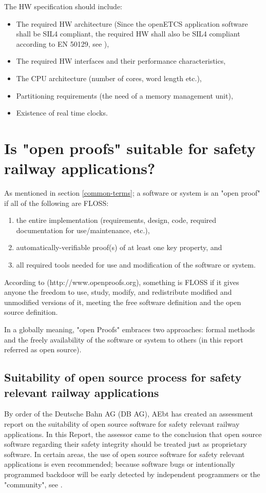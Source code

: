 \documentclass{template/openetcs_report}
\begin{document}
The HW specification should include:
\begin{itemize}\itemsep=0pt
  \item The required HW architecture (Since the openETCS application software shall be SIL4 compliant, the required HW shall also be SIL4 compliant according to EN 50129, see \cite{EN50129}),
  \item The required HW interfaces and their performance characteristics,
  \item The CPU architecture (number of cores, word length etc.),
  \item Partitioning requirements (the need of a memory management unit),
  \item Existence of real time clocks.
\end{itemize}


\section{Is "open proofs" suitable for safety railway applications?}
As mentioned in section \ref{common-terms}; a software or system is an "open proof" if all of the following are FLOSS: 
\begin{enumerate}
\itemsep=0pt
  \item the entire implementation (requirements, design, code, required documentation for use/maintenance, etc.),
  \item automatically-verifiable proof(s) of at least one key property, and
  \item all required tools needed for use and modification of the software or system.
\end{enumerate}

According to (http://www.openproofs.org), something is FLOSS if it gives anyone the freedom to use, study, modify, and redistribute modified and unmodified versions of it, meeting the free software definition and the open source definition.

In a globally meaning, "open Proofs" embraces two approaches: formal methods and the freely availability of the software or system to others (in this report referred as open source).

\subsection{Suitability of open source process for safety relevant railway applications}
By order of the Deutsche Bahn AG (DB AG), AEbt has created an assessment report on the suitability of open source software for safety relevant railway applications.
In this Report, the assessor came to the conclusion that open source software regarding their safety integrity should be treated just as proprietary software. In certain areas, the use of open source software for safety relevant applications is even recommended; because software bugs or intentionally programmed backdoor will be early detected by independent programmers or the "community", see \cite{AEbt-doc}.
\end{document}
